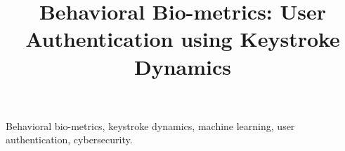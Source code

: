 \documentclass[conference]{IEEEtran}
\begin{document}
\nocite{*}

\title{Behavioral Bio-metrics: User Authentication using Keystroke Dynamics}

\author{
}

\maketitle

\begin{IEEEkeywords}
Behavioral bio-metrics, keystroke dynamics, machine learning, user authentication, cybersecurity.
\end{IEEEkeywords}



\IEEEpeerreviewmaketitle












\end{document}
